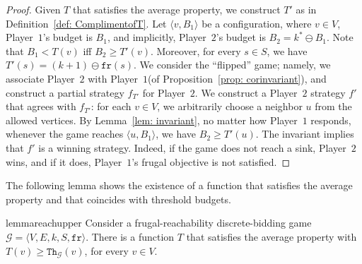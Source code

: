 \documentclass{theoretics}
\newcommand{\PO}{Player~$1$\xspace}
\newcommand{\PT}{Player~$2$\xspace}
\newcommand{\G}{{\mathcal G}}
\newcommand{\fr}{\texttt{fr}}
\newcommand{\thresh}{\texttt{Th}\xspace}
\newcommand{\zug}[1]{\langle #1  \rangle}
\begin{document}
\begin{proof}


Given $T$ that satisfies the average property, we construct $T'$ as in Definition~\ref{def: ComplimentofT}. 
Let $\zug{v, B_1}$ be a configuration, where $v \in V$, \PO's budget is $B_1$, and implicitly, \PT's budget is $B_2 = k^* \ominus B_1$. Note that $B_1 < T(v)$ iff $B_2 \geq T'(v)$. Moreover, for every $s \in S$, we have $T'(s) = (k+1) \ominus \fr(s)$. 
We consider the ``flipped'' game; namely, we associate \PT with \PO (of Proposition~\ref{prop: corinvariant}), and construct a partial strategy $f_{T'}$ for \PT. %
 We construct a \PT strategy $f'$ that agrees with $f_{T'}$: for each $v \in V$, we arbitrarily choose a neighbor $u$ from the allowed vertices. By Lemma~\ref{lem: invariant}, no matter how \PO responds, whenever the game reaches $\zug{u, B_1}$, we have $B_2 \geq T'(u)$. The invariant implies that $f'$ is a winning strategy. Indeed, if the game does not reach a sink, \PT wins, and if it does, \PO's frugal objective is not satisfied. 
\end{proof}


The following lemma shows the existence of a function that satisfies the average property and that coincides with threshold budgets.




\begin{restatable}{lemma}{reachupper}
\label{lem:reach-upper}
Consider a frugal-reachability discrete-bidding game $\G = \zug{V, E, k, S, \fr}$. There is a function $T$ %
that satisfies the average property with $T(v) \geq \thresh_\G(v)$, for every $v \in V$.
\end{restatable}
\end{document}
